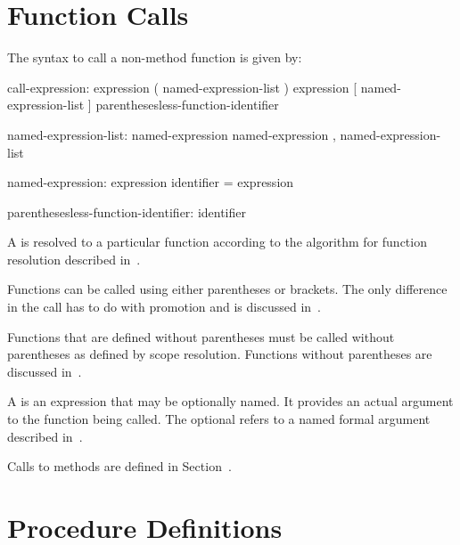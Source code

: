 \section{Function Calls}
\label{Function_Calls}

The syntax to call a non-method function is given by:
\begin{syntax}
call-expression:
  expression ( named-expression-list )
  expression [ named-expression-list ]
  parenthesesless-function-identifier

named-expression-list:
  named-expression
  named-expression , named-expression-list

named-expression:
  expression
  identifier = expression

parenthesesless-function-identifier:
  identifier
\end{syntax}


A  is resolved to a particular function
according to the algorithm for function resolution described
in~.

Functions can be called using either parentheses or brackets.  The
only difference in the call has to do with promotion and is discussed
in~.

Functions that are defined without parentheses must be called without
parentheses as defined by scope resolution.  Functions without
parentheses are discussed in~.

A  is an expression that may be optionally
named.  It provides
an actual argument to the function being called.
The optional  refers to a named formal
argument described in~.

Calls to methods are defined in Section~.


\section{Procedure Definitions}
\label{Function_Definitions}

